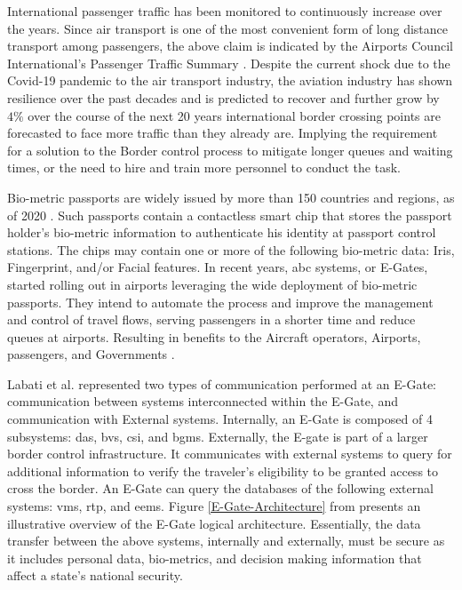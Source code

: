 International passenger traffic has been monitored to continuously increase over the years. Since air transport is one of the most convenient form of long distance transport among passengers, the above claim is indicated by the Airports Council International's Passenger Traffic Summary . Despite the current shock due to the Covid-19 pandemic to the air transport industry, the aviation industry has shown resilience over the past decades and is predicted to recover and further grow by $ 4\% $ over the course of the next 20 years  international border crossing points are forecasted to face more traffic than they already are. Implying the requirement for a solution to the Border control process to mitigate longer queues and waiting times, or the need to hire and train more personnel to conduct the task.
\par
Bio-metric passports are widely issued by more than 150 countries and regions, as of 2020 . Such passports contain a contactless smart chip that stores the passport holder's bio-metric information to authenticate his identity at passport control stations. The chips may contain one or more of the following bio-metric data: Iris, Fingerprint, and/or Facial features. In recent years, \gls{abc} systems, or E-Gates, started rolling out in airports leveraging the wide deployment of bio-metric passports. They intend to automate the process and improve the management and control of travel flows, serving passengers in a shorter time and reduce queues at airports. Resulting in benefits to the Aircraft operators, Airports, passengers, and Governments \cite{Angiolelli-meyer2015}.
\par
Labati et al. \cite{labati2016biometric} represented two types of communication performed at an E-Gate: communication between systems interconnected within the E-Gate, and communication with External systems. Internally, an E-Gate is composed of 4 subsystems: \gls{das}, \gls{bvs}, \gls{csi}, and \gls{bgms}. Externally, the E-gate is part of a larger border control infrastructure. It communicates with external systems to query for additional information to verify the traveler's eligibility to be granted access to cross the border. An E-Gate can query the databases of the following external systems: \gls{vms}, \gls{rtp}, and \gls{eems}. Figure \ref{E-Gate-Architecture} from \cite{labati2016biometric} presents an illustrative overview of the E-Gate logical architecture. Essentially, the data transfer between the above systems, internally and externally, must be secure as it includes personal data, bio-metrics, and decision making information that affect a state's national security.
